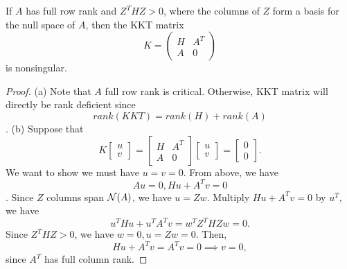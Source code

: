 \begin{refsection}
\begin{lemma}\cite[lec 6]{Robinson2015nonlinear2}
If $A$ has full row rank and $Z^THZ > 0$, where the columns of $Z$ form a basis for the null space of $A$, then the KKT matrix 
$$K = \begin{pmatrix}
H & A^T\\
A & 0
\end{pmatrix}$$
is nonsingular.
\end{lemma}
\begin{proof}
(a) Note that $A$ full row rank is critical. Otherwise, KKT matrix will directly be rank deficient since $$rank(KKT) = rank(H) + rank(A)$$.
(b)	
Suppose that
$$K\begin{bmatrix}
u \\
v
\end{bmatrix} = \begin{bmatrix}
H & A^T \\
A & 0 
\end{bmatrix} \begin{bmatrix}
u\\
v
\end{bmatrix} = \begin{bmatrix}
0\\
0
\end{bmatrix}.$$
We want to show we must have $u = v = 0$. From above, we have $$Au = 0, Hu + A^Tv = 0$$. Since $Z$ columns span $\mathcal{N}(A)$, we have $u = Zw$. Multiply $Hu + A^Tv = 0$ by $u^T$, we have $$u^THu + u^TA^Tv = w^TZ^THZw = 0.$$
Since $Z^THZ > 0$, we have $w = 0, u = Zw = 0$. Then, 
$$Hu + A^Tv = A^Tv = 0 \implies v = 0,$$
since $A^T$ has full column rank.
 
\end{proof}



\end{refsection}
